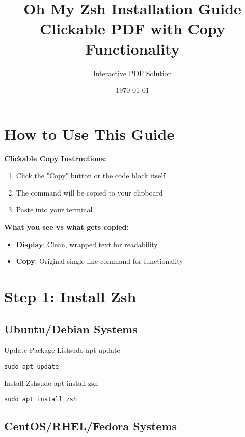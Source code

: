 \documentclass{article}
\title{Oh My Zsh Installation Guide\\
\large Clickable PDF with Copy Functionality}
\author{Interactive PDF Solution}
\date{\today}
\begin{document}
\maketitle

\section{How to Use This Guide}

\begin{infobox}
\textbf{Clickable Copy Instructions:}
\begin{enumerate}
    \item Click the "Copy" button or the code block itself
    \item The command will be copied to your clipboard
    \item Paste into your terminal
\end{enumerate}

\textbf{What you see vs what gets copied:}
\begin{itemize}
    \item \textbf{Display}: Clean, wrapped text for readability
    \item \textbf{Copy}: Original single-line command for functionality
\end{itemize}
\end{infobox}

\section{Step 1: Install Zsh}

\subsection{Ubuntu/Debian Systems}

\begin{clickablecode}{Update Package List}{sudo apt update}
\begin{lstlisting}
sudo apt update
\end{lstlisting}
\end{clickablecode}

\begin{clickablecode}{Install Zsh}{sudo apt install zsh}
\begin{lstlisting}
sudo apt install zsh
\end{lstlisting}
\end{clickablecode}

\subsection{CentOS/RHEL/Fedora Systems}
\end{document}
